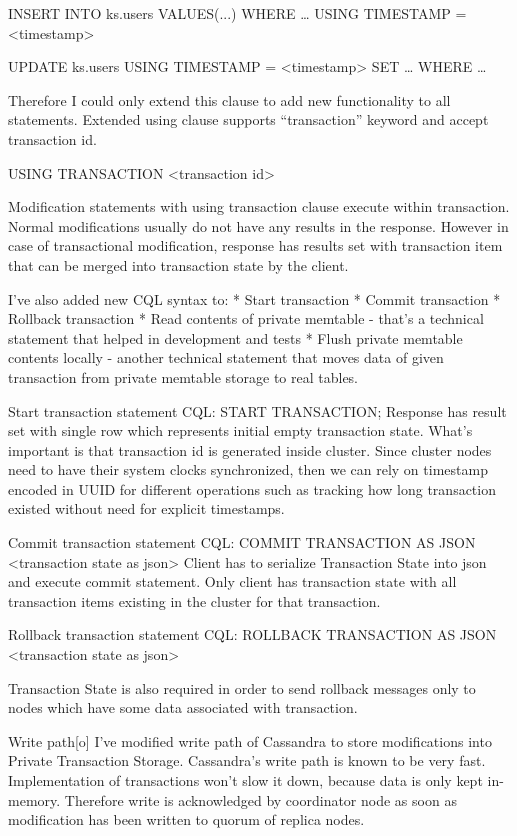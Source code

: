 INSERT INTO ks.users VALUES(...) WHERE … USING TIMESTAMP = <timestamp>


UPDATE ks.users USING TIMESTAMP = <timestamp> SET … WHERE … 


Therefore I could only extend this clause to add new functionality to all statements. Extended using clause supports “transaction” keyword and accept transaction id.


USING TRANSACTION <transaction id>


Modification statements with using transaction clause execute within transaction. 
Normal modifications usually do not have any results in the response. However in case of transactional modification, response has results set with transaction item that can be merged into transaction state by the client.


I’ve also added new CQL syntax to:
* Start transaction
* Commit transaction
* Rollback transaction
* Read contents of private memtable - that’s a technical statement that helped in development and tests
* Flush private memtable contents locally - another technical statement that moves data of given transaction from private memtable storage to real tables.


Start transaction statement
CQL:        START TRANSACTION;
Response has result set with single row which represents initial empty transaction state. 
What’s important is that transaction id is generated inside cluster. Since cluster nodes need to have their system clocks synchronized, then we can rely on timestamp encoded in UUID for different operations such as tracking how long transaction existed without need for explicit timestamps.


Commit transaction statement
CQL: COMMIT TRANSACTION AS JSON <transaction state as json>
Client has to serialize Transaction State into json and execute commit statement. Only client has transaction state with all transaction items existing in the cluster for that transaction.


Rollback transaction statement
CQL: ROLLBACK TRANSACTION AS JSON <transaction state as json>


Transaction State is also required in order to send rollback messages only to nodes which have some data associated with transaction.




Write path[o]
I’ve modified write path of Cassandra to store modifications into Private Transaction Storage.
Cassandra’s write path is known to be very fast. Implementation of transactions won’t slow it down, because data is only kept in-memory. Therefore write is acknowledged by coordinator node as soon as modification has been written to quorum of replica nodes.



